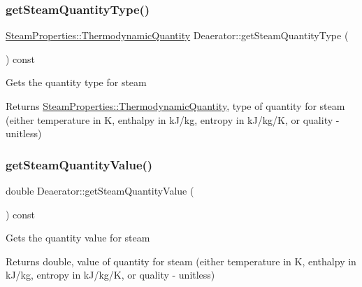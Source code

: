 \mbox{\label{class_deaerator_a18abbdc5ec78f71e1d2495b0c64c77ec}} 
\subsubsection{\texorpdfstring{get\+Steam\+Quantity\+Type()}{getSteamQuantityType()}\hspace{0.1cm}{\footnotesize\ttfamily [3/3]}}
{\footnotesize\ttfamily \hyperlink{class_steam_properties_ae0294bedf7d178c2d8fb6aed0f62fbff}{Steam\+Properties\+::\+Thermodynamic\+Quantity} Deaerator\+::get\+Steam\+Quantity\+Type (\begin{DoxyParamCaption}{ }\end{DoxyParamCaption}) const}

Gets the quantity type for steam \begin{DoxyReturn}{Returns}
\hyperlink{class_steam_properties_ae0294bedf7d178c2d8fb6aed0f62fbff}{Steam\+Properties\+::\+Thermodynamic\+Quantity}, type of quantity for steam (either temperature in K, enthalpy in k\+J/kg, entropy in k\+J/kg/K, or quality -\/ unitless) 
\end{DoxyReturn}
\mbox{\label{class_deaerator_a5473feedca64e7c44143d422ed3e2401}} 
\subsubsection{\texorpdfstring{get\+Steam\+Quantity\+Value()}{getSteamQuantityValue()}\hspace{0.1cm}{\footnotesize\ttfamily [1/3]}}
{\footnotesize\ttfamily double Deaerator\+::get\+Steam\+Quantity\+Value (\begin{DoxyParamCaption}{ }\end{DoxyParamCaption}) const}

Gets the quantity value for steam \begin{DoxyReturn}{Returns}
double, value of quantity for steam (either temperature in K, enthalpy in k\+J/kg, entropy in k\+J/kg/K, or quality -\/ unitless) 
\end{DoxyReturn}
\mbox{\label{class_deaerator_a5473feedca64e7c44143d422ed3e2401}} 
